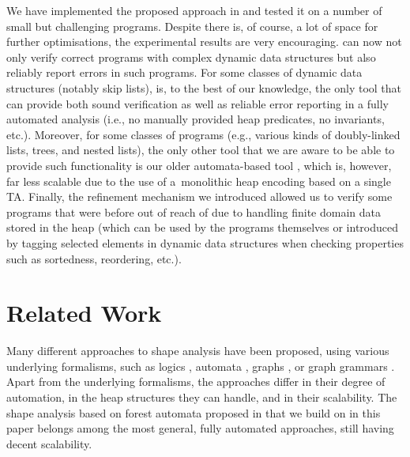 {We have implemented the proposed approach in \forester{} and tested it on a
number of small but challenging programs. Despite there is, of course, a lot of
space for further optimisations, the experimental results are 
% 
%
very encouraging.
%
\forester{} can now not only verify correct programs with complex dynamic data
structures but also reliably report errors in such programs. For some classes of
dynamic data structures (notably skip lists), \forester{} is, to the best of our
knowledge, the only tool that can provide both sound verification as well as
reliable error reporting in a fully automated analysis (i.e., no manually
provided heap predicates, no invariants, etc.). Moreover, for some classes of
programs (e.g., various kinds of doubly-linked lists, trees, and nested lists),
the only other tool that we are aware to be able to provide such functionality
is our older automata-based tool \cite{bhrv06b}, which is, however, far less
scalable due to the use of a~monolithic heap encoding based on a single TA. Finally,
the refinement mechanism we introduced allowed us to verify some programs that
were before out of reach of \forester{} due to handling finite domain data
stored in the heap (which can be used by the programs themselves or introduced
by tagging selected elements in dynamic data structures when checking properties
such as sortedness, reordering, etc.).


\section{Related Work}

Many different approaches to shape analysis have been proposed, using various
underlying formalisms, such as logics
\cite{jensen,pale,InvaderCAV08,thor10,dragoi:atva12,sleek13}, automata
\cite{bhrv06b,deg06,forester12,boxes13,lists-counters}, graphs
\cite{sas07:chang_rival_necula,dudka13sas}, or graph grammars \cite{juggrnaut10}.
Apart from the underlying formalisms, the approaches differ in their degree of
automation, in the heap structures they can handle, and in their scalability.
The shape analysis based on forest automata proposed in \cite{boxes13} that we
build on in this paper belongs among the most general, fully automated
approaches, still having decent scalability.

}
